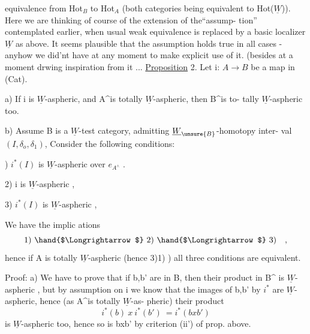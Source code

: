 equivalence from Hot$_B$ to Hot$_A$  (both categories being equivalent to
Hot($\underline{W}$)).  Here we are thinking of course of the extension of the``assump-%
tion'' contemplated earlier,  when usual weak equivalence is replaced by
a basic localizer $\underline{W}$ as above.  It seems plausible that the assumption
holds true in all cases  -  anyhow we did'nt have at any moment to make
explicit use of it. (besides at a moment drwing inspiration from it ...\hand{)}
\uline{Proposition} 2.   Let  i: $A\to B$ be a map in (Cat).

a)  If i is $\underline{W}$-aspheric,  and A\^{}is totally $\underline{W}$-aspheric,  then B\^{}is to-%
tally $\underline{W}$-aspheric too.

b)  Assume  B is a $\underline{W}$-test category,  admitting   $\underline{W}_{\unsure{B}}$-homotopy  inter-%
val$(I,\delta_o,\delta_1)$,  Consider the following conditions:

)  $i^*(I)$ is $\underline{W}$-aspheric over $e_{A^\wedge}$ . 

2)  i is $\underline{W}$-aspheric ,

3)  $i^*(I)$  is $\underline{W}$-aspheric ,  

We have the implic ations
\[ 1)\ \hand{$\Longrightarrow$}\ 2)\ \hand{$\Longrightarrow$}\ 3) \quad , \]
hence if A is totally $\underline{W}$-aspheric (hence  3)\hand{$\Longrightarrow$}1) )  all three conditions
are equivalent.

Proof:   a)  We have to prove that if b,b' are in B,  then
their product in B\^{} is $\underline{W}$-aspheric ,  but by assumption on i we know that
the images of b,b' by $i^*$  are $\underline{W}$-aspheric,  hence (as A\^{}is totally $\underline{W}$-as-%
pheric)  their product
\[ i^*(b) \ x\ i^*(b') \ = i^*(bxb') \]
is $\underline{W}$-aspheric too, hence so is bxb'  by criterion (ii') of prop. above.

